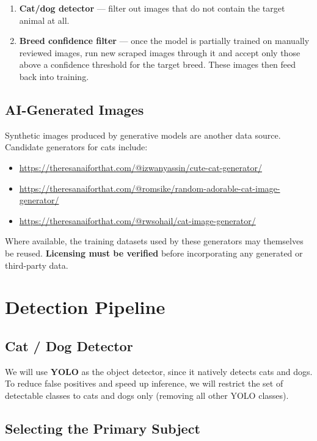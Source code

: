 \documentclass[10pt,twocolumn]{article}
\begin{document}
\begin{enumerate}[noitemsep]
  \item \textbf{Cat/dog detector} --- filter out images that do not contain the
        target animal at all.
  \item \textbf{Breed confidence filter} --- once the model is partially
        trained on manually reviewed images, run new scraped images through it
        and accept only those above a confidence threshold for the target breed.
        These images then feed back into training.
\end{enumerate}

\subsection{AI-Generated Images}

Synthetic images produced by generative models are another data source.
Candidate generators for cats include:

\begin{itemize}[noitemsep]
  \item \url{https://theresanaiforthat.com/@izwanyassin/cute-cat-generator/}
  \item \url{https://theresanaiforthat.com/@romsike/random-adorable-cat-image-generator/}
  \item \url{https://theresanaiforthat.com/@rwsohail/cat-image-generator/}
\end{itemize}

Where available, the training datasets used by these generators may themselves
be reused. \textbf{Licensing must be verified} before incorporating any
generated or third-party data.

\section{Detection Pipeline}

\subsection{Cat / Dog Detector}

We will use \textbf{YOLO} as the object detector, since it natively detects
cats and dogs. To reduce false positives and speed up inference, we will
restrict the set of detectable classes to cats and dogs only (removing all
other YOLO classes).

\subsection{Selecting the Primary Subject}
\end{document}
